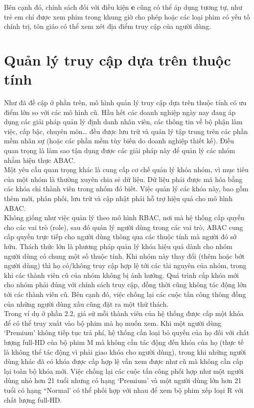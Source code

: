 Bên cạnh đó, chính sách đối với điều kiện \textbf{e} cũng có thể áp dụng tương tự, như trẻ em
chỉ được xem phim trong khung giờ cho phép hoặc các loại phim có yếu tố chính trị,
tôn giáo có thể xem xét địa điểm truy cập của người dùng.
\section{Quản lý truy cập dựa trên thuộc tính}
Như đã đề cập ở phần trên, mô hình quản lý truy cập dựa trên thuộc tính có ưu
điểm lớn so với các mô hình cũ. Hầu hết các doanh nghiệp ngày nay đang áp dụng các
giải pháp quản lý định danh nhân viên, các thông tin về bộ phận làm việc, cấp bậc,
chuyên môn… đều được lưu trữ và quản lý tập trung trên các phần mềm nhân sự (hoặc các phần mềm tùy biến do doanh nghiệp thiết kế). Điều quan trọng là làm sao tận dụng
được các giải pháp này để quản lý các nhóm nhằm hiện thực ABAC. \\

Một yêu cầu quan trọng khác là cung cấp cơ chế quản lý khóa nhóm, vì mục tiêu
của một nhóm là thường xuyên chia sẻ dữ liệu. Dữ liệu phải được mã hóa bằng các khóa
chỉ thành viên trong nhóm đó biết. Việc quản lý các khóa này, bao gồm thêm mới, phân
phối, lưu trữ và cập nhật phải hỗ trợ hiệu quả cho mô hình ABAC.\\

Không giống như việc quản lý theo mô hình RBAC, nơi mà hệ thống cấp quyền
cho các vai trò (role), sau đó quản lý người dùng trong các vai trò, ABAC cung cấp
quyền trực tiếp cho người dùng thông qua các thuộc tính mà người đó sở hữu. Thách
thức lớn là phương pháp quản lý khóa hiệu quả dành cho nhóm người dùng có chung
một số thuộc tính. Khi nhóm này thay đổi (thêm hoặc bớt người dùng) thì họ có/không
truy cập hợp lệ tới các tài nguyên của nhóm, trong khi các thành viên cũ của nhóm không
bị ảnh hưởng. Quá trình cấp khóa mới cho nhóm phải đúng với chính sách truy cập, đồng
thời cũng không tác động lớn tới các thành viên cũ. Bên cạnh đó, việc chống lại các cuộc
tấn công thông đồng của những người dùng xấu cũng đặt ra một thử thách. \\

Trong ví dụ ở phần 2.2, giả sử mỗi thành viên của hệ thống được cấp một khóa
để có thể truy xuất vào bộ phim mà họ muốn xem. Khi một người dùng ‘Premium’ không
tiếp tục trả phí, hệ thống cần loại bỏ quyền của họ đối với chất lượng full-HD của bộ
phim M mà không cần tác động đến khóa của họ (thực tế là không thể tác động vì phải
giao khóa cho người dùng), trong khi những người dùng khác đã có khóa được cấp hợp
lệ vẫn xem được như cũ mà không cần cấp lại toàn bộ khóa mới. Việc chống lại các cuộc
tấn công phối hợp như một người dùng nhỏ hơn 21 tuổi nhưng có hạng ‘Premium’ và
một người dùng lớn hơn 21 tuổi có hạng “Normal’ có thể phối hợp với nhau để xem bộ
phim xếp loại R với chất lượng full-HD. \\

